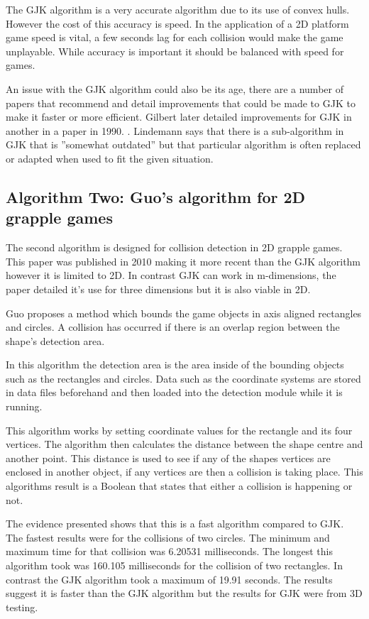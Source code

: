 \documentclass{scrartcl}
\begin{document}
The GJK algorithm is a very accurate algorithm due to its use of convex hulls. However the cost of this accuracy is speed. In the application of a 2D platform game speed is vital, a few seconds lag for each collision would make the game unplayable. While accuracy is important it should be balanced with speed for games.

An issue with the GJK algorithm could also be its age, there are a number of papers that recommend and detail improvements that could be made to GJK to make it faster or more efficient. Gilbert later detailed improvements for GJK in another in a paper in 1990. \cite{Gilbert2}.  Lindemann says that there is a sub-algorithm in GJK that is ''somewhat outdated'' \cite{lindemanngjk} but that particular algorithm is often replaced or adapted when used to fit the given situation.
	
\subsection{Algorithm Two: Guo's algorithm for 2D grapple games}
The second algorithm is designed for collision detection in 2D grapple games. This paper was published in 2010 making it more recent than the GJK algorithm however it is limited to 2D. In contrast GJK can work in m-dimensions, the paper detailed it’s use for three dimensions but it is also viable in 2D.  
	
Guo \cite{Guo} proposes a method which bounds the game objects in axis aligned rectangles and circles. A collision has occurred if there is an overlap region between the shape's detection area.
	
In this algorithm the detection area is the area inside of the bounding objects such as the rectangles and circles.  Data such as the coordinate systems are stored in data files beforehand and then loaded into the detection module while it is running.
	
This algorithm works by setting coordinate values for the rectangle and its four vertices.  The algorithm then calculates the distance between the shape centre and another point. This distance is used to see if any of the shapes vertices are enclosed in another object, if any vertices are then a collision is taking place. This algorithms result is a Boolean that states that either a collision is happening or not.
	
The evidence presented shows that this is a fast algorithm compared to GJK. The fastest results were for the collisions of two circles. The minimum and maximum time for that collision was 6.20531 milliseconds. The longest this algorithm took  was 160.105 milliseconds for the collision of two rectangles.  In contrast the GJK algorithm took a maximum of 19.91 seconds.  The results suggest it is faster than the GJK algorithm but the results for GJK were from 3D testing.
	
\end{document}
